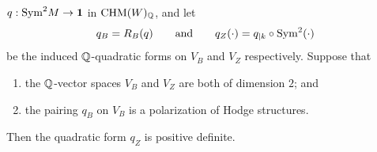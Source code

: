 \begin{theorem}
  \(q : \mathrm{Sym}^2 M \to \mathbf{1}\) in \(\mathrm{CHM}(W)_{\mathbb{Q}}\), and let
  \[q_B = R_B(q) \qquad \text{and} \qquad
    q_Z(\cdot) = q_{\vert{k}} \circ \mathrm{Sym}^2(\cdot)\]
  be the induced \(\mathbb{Q}\)-quadratic forms on \(V_B\) and \(V_Z\) respectively.
  Suppose that
  \begin{enumerate}
    \item the \(\mathbb{Q}\)-vector spaces \(V_B\) and \(V_Z\) are both of dimension
      \(2\); and
    \item the pairing \(q_B\) on \(V_B\) is a polarization of Hodge structures.
  \end{enumerate}
  Then the quadratic form \(q_Z\) is positive definite.
\end{theorem}

